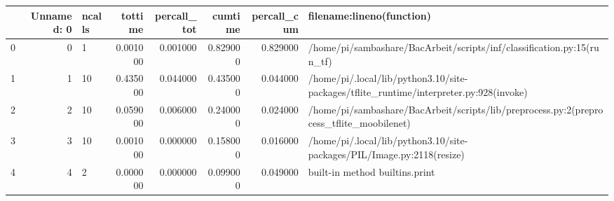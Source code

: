 \begin{tabular}{lrlrrrrl}
\toprule
 & Unnamed: 0 & ncalls & tottime & percall_tot & cumtime & percall_cum & filename:lineno(function) \\
\midrule
0 & 0 &         1 & 0.001000 & 0.001000 & 0.829000 & 0.829000 & /home/pi/sambashare/BacArbeit/scripts/inf/classification.py:15(run_tf) \\
1 & 1 &        10 & 0.435000 & 0.044000 & 0.435000 & 0.044000 & /home/pi/.local/lib/python3.10/site-packages/tflite_runtime/interpreter.py:928(invoke) \\
2 & 2 &        10 & 0.059000 & 0.006000 & 0.240000 & 0.024000 & /home/pi/sambashare/BacArbeit/scripts/lib/preprocess.py:2(preprocess_tflite_moobilenet) \\
3 & 3 &        10 & 0.001000 & 0.000000 & 0.158000 & 0.016000 & /home/pi/.local/lib/python3.10/site-packages/PIL/Image.py:2118(resize) \\
4 & 4 &         2 & 0.000000 & 0.000000 & 0.099000 & 0.049000 & {built-in method builtins.print} \\
\bottomrule
\end{tabular}
